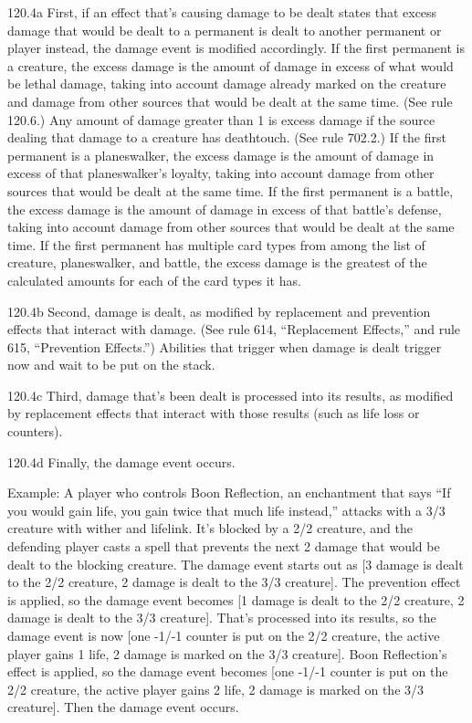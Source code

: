 120.4a First, if an effect that’s causing damage to be dealt states that excess damage that would be dealt to a permanent is dealt to another permanent or player instead, the damage event is modified accordingly. If the first permanent is a creature, the excess damage is the amount of damage in excess of what would be lethal damage, taking into account damage already marked on the creature and damage from other sources that would be dealt at the same time. (See rule 120.6.) Any amount of damage greater than 1 is excess damage if the source dealing that damage to a creature has deathtouch. (See rule 702.2.) If the first permanent is a planeswalker, the excess damage is the amount of damage in excess of that planeswalker’s loyalty, taking into account damage from other sources that would be dealt at the same time. If the first permanent is a battle, the excess damage is the amount of damage in excess of that battle’s defense, taking into account damage from other sources that would be dealt at the same time. If the first permanent has multiple card types from among the list of creature, planeswalker, and battle, the excess damage is the greatest of the calculated amounts for each of the card types it has.

120.4b Second, damage is dealt, as modified by replacement and prevention effects that interact with damage. (See rule 614, “Replacement Effects,” and rule 615, “Prevention Effects.”) Abilities that trigger when damage is dealt trigger now and wait to be put on the stack.

120.4c Third, damage that’s been dealt is processed into its results, as modified by replacement effects that interact with those results (such as life loss or counters).

120.4d Finally, the damage event occurs.

Example: A player who controls Boon Reflection, an enchantment that says “If you would gain life, you gain twice that much life instead,” attacks with a 3/3 creature with wither and lifelink. It’s blocked by a 2/2 creature, and the defending player casts a spell that prevents the next 2 damage that would be dealt to the blocking creature. The damage event starts out as [3 damage is dealt to the 2/2 creature, 2 damage is dealt to the 3/3 creature]. The prevention effect is applied, so the damage event becomes [1 damage is dealt to the 2/2 creature, 2 damage is dealt to the 3/3 creature]. That’s processed into its results, so the damage event is now [one -1/-1 counter is put on the 2/2 creature, the active player gains 1 life, 2 damage is marked on the 3/3 creature]. Boon Reflection’s effect is applied, so the damage event becomes [one -1/-1 counter is put on the 2/2 creature, the active player gains 2 life, 2 damage is marked on the 3/3 creature]. Then the damage event occurs.

